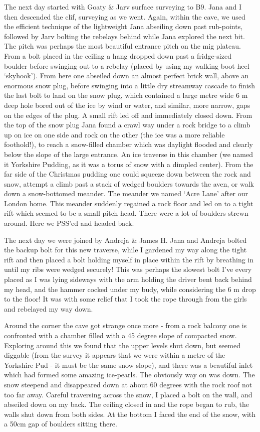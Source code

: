 The next day started with Goaty \& Jarv surface surveying to B9. Jana
and I then descended the clif, surveying as we went. Again, within the
cave, we used the efficient technique of the lightweight Jana abseiling
down past rub-points, followed by Jarv bolting the rebelays behind while
Jana explored the next bit. The pitch was perhaps the most beautiful
entrance pitch on the mig plateau. From a bolt placed in the ceiling a
hang dropped down past a fridge-sized boulder before swinging out to a
rebelay (placed by using my walking boot heel `skyhook'). From here one
abseiled down an almost perfect brick wall, above an enormous snow plug,
before swinging into a little dry streamway cascade to finish the last
bolt to land on the snow plug, which contained a large metre wide 6 m
deep hole bored out of the ice by wind or water, and similar, more
narrow, gaps on the edges of the plug. A small rift led off and
immediately closed down. From the top of the snow plug Jana found a
crawl way under a rock bridge to a climb up on ice on one side and rock
on the other (the ice was a more reliable foothold!), to reach a
snow-filled chamber which was daylight flooded and clearly below the
slope of the large entrance. An ice traverse in this chamber (we named
it Yorkshire Pudding, as it was a torus of snow with a dimpled center).
From the far side of the Christmas pudding one could squeeze down
between the rock and snow, attempt a climb past a stack of wedged
boulders towards the aven, or walk down a snow-bottomed meander. The
meander we named `Acre Lane' after our London home. This meander
suddenly regained a rock floor and led on to a tight rift which seemed
to be a small pitch head. There were a lot of boulders strewn around.
Here we PSS'ed and headed back.

The next day we were joined by Andreja \& James H. Jana and Andreja
bolted the backup bolt for this new traverse, while I gardened my way
along the tight rift and then placed a bolt holding myself in place
within the rift by breathing in until my ribs were wedged securely! This
was perhaps the slowest bolt I've every placed as I was lying sideways
with the arm holding the driver bent back behind my head, and the hammer
cocked under my budy, while considering the 6 m drop to the floor! It
was with some relief that I took the rope through from the girls and
rebelayed my way down.

Around the corner the cave got strange once more - from a rock balcony
one is confronted with a chamber filled with a 45 degree slope of
compacted snow. Exploring around this we found that the upper levels
shut down, but seemed diggable (from the survey it appears that we were
within a metre of the Yorkshire Pud - it must be the same snow slope),
and there was a beautiful inlet which had formed some amazing
ice-pearls. The obviously way on was down. The snow steepend and
disappeared down at about 60 degrees with the rock roof not too far
away. Careful traversing across the snow, I placed a bolt on the wall,
and abseiled down on my back. The ceiling closed in and the rope began
to rub, the walls shut down from both sides. At the bottom I faced the
end of the snow, with a 50cm gap of boulders sitting there.

